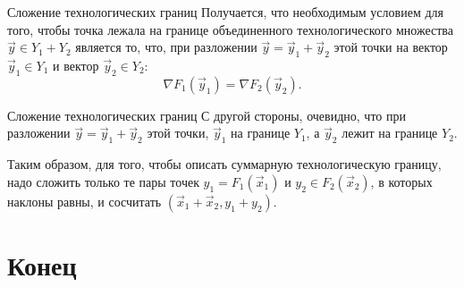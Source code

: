 \documentclass{beamer}
\begin{document}
\begin{frame}{Сложение технологических границ}
Получается, что необходимым условием для того, чтобы точка лежала на границе объединенного технологического множества $\vec y \in Y_1 + Y_2$ является то, что, при разложении $\vec y = \vec y_1 + \vec y_2$ этой точки на вектор $\vec y_1 \in Y_1$ и вектор $\vec y_2 \in Y_2$:
$$ \nabla F_1(\vec y_1) =  \nabla F_2(\vec y_2).$$

\end{frame}

\begin{frame}{Сложение технологических границ}
С другой стороны, очевидно, что при разложении $\vec y = \vec y_1 + \vec y_2$ этой точки, $\vec y_1$ на границе $Y_1$, а $\vec y_2$ лежит на границе $Y_2$. 

Таким образом, для того, чтобы описать суммарную технологическую границу, надо сложить только те пары точек $y_1 = F_1(\vec x_1)$ и $y_2 \in F_2(\vec x_2)$, в которых наклоны равны, и сосчитать $(\vec x_1 + \vec x_2, y_1 + y_2)$.

\end{frame}

\section{Конец}
\end{document}

